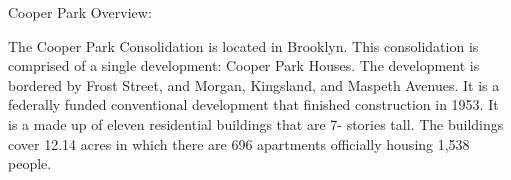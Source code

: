 Cooper Park Overview:        

      

The Cooper Park Consolidation is located in Brooklyn. This consolidation is comprised of a single development: Cooper Park Houses. The development is bordered by Frost Street, and Morgan, Kingsland, and Maspeth Avenues. It is a federally funded conventional development that finished construction in 1953. It is a made up of eleven residential buildings that are 7- stories tall. The buildings cover 12.14 acres in which there are 696 apartments officially housing 1,538 people.    
